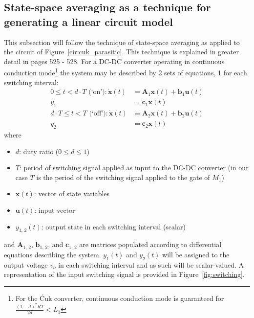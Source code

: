\subsection{State-space averaging as a technique for generating a linear circuit model}\label{sec:ss_averaging}
This subsection will follow the technique of state-space averaging as applied to the circuit of Figure~\ref{cir:cuk_parasitic}. This technique is explained in greater detail in \cite{cuk} pages 525 - 528.
\newpar
For a DC-DC converter operating in continuous conduction mode\footnote{
For the \'{C}uk converter, continuous conduction mode is guaranteed for $\frac{(1 - d)^2 R T}{2 d} < L_1$
} the system may be described by 2 sets of equations, 1 for each switching interval:
\begin{align}
0 \leq t < d \cdot T \text{ (`on')}:
\dot{\boldsymbol{x}}(t) &= \boldsymbol{A}_1 \boldsymbol{x}(t) + \boldsymbol{b}_1 \boldsymbol{u}(t)
\nonumber
\\[11pt]
y_1&= \boldsymbol{c}_1 \boldsymbol{x}(t)\label{eqn:equations_on}
\\[11pt]
d \cdot T \leq t < T \text{ (`off')}:
\dot{\boldsymbol{x}}(t) &= \boldsymbol{A}_2 \boldsymbol{x}(t) + \boldsymbol{b}_2 \boldsymbol{u}(t)
\nonumber
\\[11pt]
y_2&= \boldsymbol{c}_2 \boldsymbol{x}(t)\label{eqn:equations_off}
\end{align}
where
\begin{itemize}
\item $d$: duty ratio ($0 \leq d \leq 1$)
\item $T$: period of switching signal applied as input to the DC-DC converter (in our case $T$ is the period of the switching signal applied to the gate of $M_1$)
\item $\boldsymbol{x}(t)$: vector of state variables
\item $\boldsymbol{u}(t)$: input vector
\item $y_{1, \, 2}(t)$: output state in each switching interval (scalar)
\end{itemize}
and $\boldsymbol{A}_{1, \, 2}$, $\boldsymbol{b}_{1, \, 2}$, and $\boldsymbol{c}_{1, \, 2}$ are matrices populated according to differential equations describing the system. $y_{1}(t)$ and $y_{2}(t)$ will be assigned to the output voltage $v_o$ in each switching interval and as such will be scalar-valued.
\newpar
A representation of the input switching signal is provided in Figure~\ref{fig:switching}.
